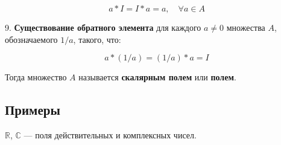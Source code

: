 {\[
a * I = I * a = a, \quad \forall a \in A
\]



9. \textbf{Существование обратного элемента} для каждого \( a \neq 0 \) множества \( A \), обозначаемого \( 1/a \), такого, что:


\[
a * (1/a) = (1/a) * a = I
\]



Тогда множество \( A \) называется \textbf{скалярным полем} или \textbf{полем}.

\subsection*{Примеры}

\( \mathbb{R} \), \( \mathbb{C} \) — поля действительных и комплексных чисел.

}